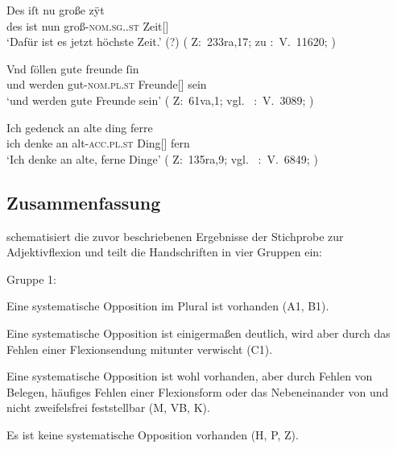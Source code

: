 \begin{exe}
\ex \label{ex:kczregel}
	\begin{xlist}
	\ex \label{ex:kczregel_1}
		\gll Des iſt nu große zÿt \\
			des ist nun groß-\textsc{nom.sg.\FemI.st} Zeit[\FemI] \\
		\trans `Dafür ist es jetzt höchste Zeit.' (?)
			(%
				Z:~233ra,17; zu
				\KC:~V.~11620;
				\cite[293]{schroeder1895}%
			)

	\ex \label{ex:kczregel_2}
		\gll Vnd ſöllen gute freunde ſin \\
			und werden gut-\textsc{nom.pl.st} Freunde[\MascA] sein \\
		\trans `und werden gute Freunde sein'
			(%
				Z:~61va,1; vgl.~%
				\KC:~V.~3089;
				\cite[137]{schroeder1895}%
			)

	\ex \label{ex:kczregel_3}
		\gll Ich gedenck an alte ding ferre \\
			ich denke an alt-\textsc{acc.pl.st} Ding[\NeutI] fern \\
		\trans `Ich denke an alte, ferne Dinge'
			(%
				Z:~135ra,9; vgl.~%
				\KC:~V.~6849;
				\cite[206]{schroeder1895}%
			)
	\end{xlist}
\end{exe}

\subsection{Zusammenfassung}

 schematisiert die zuvor beschriebenen Ergebnisse der
Stichprobe zur Adjektivflexion und teilt die Handschriften in vier Gruppen ein:

\begin{labeling}{Gruppe 1:}
	\item[Gruppe 1:] Eine systematische Opposition im Plural ist vorhanden
	(A1, B1).

	\item[Gruppe 2:] Eine systematische Opposition ist einigermaßen deutlich,
	wird aber durch das Fehlen einer Flexionsendung mitunter verwischt
	(C1).

	\item[Gruppe 3:] Eine systematische Opposition ist wohl vorhanden, aber
	durch Fehlen von Belegen, häufiges Fehlen einer Flexionsform oder das
	Nebeneinander von  und  nicht zweifelsfrei feststellbar
	(M, VB, K).

	\item[Gruppe 4:] Es ist keine systematische Opposition vorhanden
	(H, P, Z).
\end{labeling}

